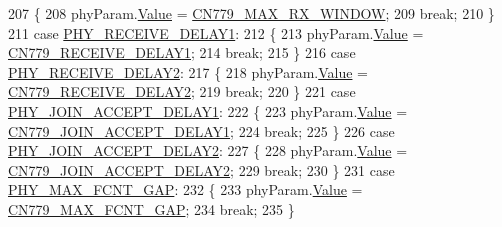\begin{DoxyCode}
207         \{
208             phyParam.\mbox{\hyperlink{unionu_phy_param_a8e0dcce3428a8051614e852b8836d0d1}{Value}} = \mbox{\hyperlink{group___r_e_g_i_o_n_c_n779_ga3d2b8590a2e727046db467d647c96518}{CN779\_MAX\_RX\_WINDOW}};
209             \textcolor{keywordflow}{break};
210         \}
211         \textcolor{keywordflow}{case} \mbox{\hyperlink{group___r_e_g_i_o_n_gga51cbe8f5433d914fe9cf81b451de2c2da3680d45f45e3e0a96ce9f1e1b5ed7371}{PHY\_RECEIVE\_DELAY1}}:
212         \{
213             phyParam.\mbox{\hyperlink{unionu_phy_param_a8e0dcce3428a8051614e852b8836d0d1}{Value}} = \mbox{\hyperlink{group___r_e_g_i_o_n_c_n779_gadd96388a9097e2d47d77a459b13c1309}{CN779\_RECEIVE\_DELAY1}};
214             \textcolor{keywordflow}{break};
215         \}
216         \textcolor{keywordflow}{case} \mbox{\hyperlink{group___r_e_g_i_o_n_gga51cbe8f5433d914fe9cf81b451de2c2da9c7e3df5f55fab406960a9e5bf635155}{PHY\_RECEIVE\_DELAY2}}:
217         \{
218             phyParam.\mbox{\hyperlink{unionu_phy_param_a8e0dcce3428a8051614e852b8836d0d1}{Value}} = \mbox{\hyperlink{group___r_e_g_i_o_n_c_n779_ga40b53070cc108b1704c23fd196bc1a02}{CN779\_RECEIVE\_DELAY2}};
219             \textcolor{keywordflow}{break};
220         \}
221         \textcolor{keywordflow}{case} \mbox{\hyperlink{group___r_e_g_i_o_n_gga51cbe8f5433d914fe9cf81b451de2c2daf564c82ebd72dcd6c4fc1e702b2ec64c}{PHY\_JOIN\_ACCEPT\_DELAY1}}:
222         \{
223             phyParam.\mbox{\hyperlink{unionu_phy_param_a8e0dcce3428a8051614e852b8836d0d1}{Value}} = \mbox{\hyperlink{group___r_e_g_i_o_n_c_n779_gae35de851225832e6fce8edbd9cc87e35}{CN779\_JOIN\_ACCEPT\_DELAY1}};
224             \textcolor{keywordflow}{break};
225         \}
226         \textcolor{keywordflow}{case} \mbox{\hyperlink{group___r_e_g_i_o_n_gga51cbe8f5433d914fe9cf81b451de2c2da04e6c3d25ce44a74c0a29f28aa92eb48}{PHY\_JOIN\_ACCEPT\_DELAY2}}:
227         \{
228             phyParam.\mbox{\hyperlink{unionu_phy_param_a8e0dcce3428a8051614e852b8836d0d1}{Value}} = \mbox{\hyperlink{group___r_e_g_i_o_n_c_n779_gaba22c62202d5f40c7c952706604f961b}{CN779\_JOIN\_ACCEPT\_DELAY2}};
229             \textcolor{keywordflow}{break};
230         \}
231         \textcolor{keywordflow}{case} \mbox{\hyperlink{group___r_e_g_i_o_n_gga51cbe8f5433d914fe9cf81b451de2c2da01c12b14686172b4a3c4d095deef4248}{PHY\_MAX\_FCNT\_GAP}}:
232         \{
233             phyParam.\mbox{\hyperlink{unionu_phy_param_a8e0dcce3428a8051614e852b8836d0d1}{Value}} = \mbox{\hyperlink{group___r_e_g_i_o_n_c_n779_ga6bac9924ad75dba200876f5ddcb8d91e}{CN779\_MAX\_FCNT\_GAP}};
234             \textcolor{keywordflow}{break};
235         \}

\end{DoxyCode}
